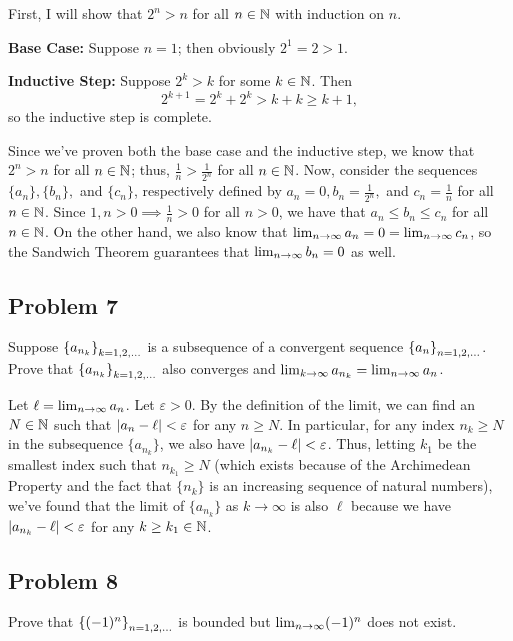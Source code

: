 \documentclass[main.tex]{subfiles}
\begin{document}
\begin{soln}
    First, I will show that $2^n > n$ for all $n\in \mathbb N$ with induction on $n$.

    \textbf{Base Case:} Suppose $n = 1$; then obviously $2^1 = 2 > 1$.

    \textbf{Inductive Step:} Suppose $2^k > k$ for some $k\in \mathbb N$. Then
    \[2^{k + 1} = 2^k + 2^k > k + k \ge k + 1,\]
    so the inductive step is complete.

    Since we've proven both the base case and the inductive step, we know that $2^n > n$ for all $n\in \mathbb N$; thus, $\frac{1}{n} > \frac{1}{2^n}$ for all $n\in \mathbb N$. Now, consider the sequences $\{a_n\}, \{b_n\}, $ and $\{c_n\}$, respectively defined by $a_n = 0, b_n = \frac{1}{2^n},$ and $c_n = \frac{1}{n}$ for all $n\in \mathbb N$. Since $1, n > 0\implies \frac{1}{n} > 0$ for all $n > 0$, we have that $a_n\le b_n\le c_n$ for all $n\in \mathbb N$. On the other hand, we also know that $\lim_{n\to \infty} a_n = 0 = \lim_{n\to \infty} c_n$, so the Sandwich Theorem guarantees that $\lim_{n\to \infty} b_n = 0$ as well.
\end{soln}
\eject

\subsection{Problem 7}
\begin{claim}
    Suppose $\left\{ a_{n_k} \right\}_{k = 1, 2, \ldots}$ is a subsequence of a convergent sequence $\left\{ a_n \right\}_{n = 1, 2, \ldots}$. Prove that $\left\{ a_{n_k} \right\}_{k = 1, 2, \ldots}$ also converges and $\lim_{k\to \infty} a_{n_k} = \lim_{n\to \infty} a_n$.
\end{claim}

\begin{soln}
    Let $\ell = \lim_{n\to \infty} a_n$. Let $\varepsilon > 0$. By the definition of the limit, we can find an $N\in \mathbb N$ such that $\left\lvert a_n - \ell \right\rvert < \varepsilon$ for any $n\ge N$. In particular, for any index $n_k\ge N$ in the subsequence $\{a_{n_k}\}$, we also have $\left\lvert a_{n_k} - \ell \right\rvert < \varepsilon$. Thus, letting $k_1$ be the smallest index such that $n_{k_1}\ge N$ (which exists because of the Archimedean Property and the fact that $\{n_k\}$ is an increasing sequence of natural numbers), we've found that the limit of $\{a_{n_k}\}$ as $k\to\infty$ is also $\ell$ because we have $\left\lvert a_{n_k} - \ell \right\rvert < \varepsilon$ for any $k\ge k_1\in \mathbb N$.
\end{soln}
\eject

\subsection{Problem 8}
\begin{claim}
    Prove that $\left\{ (-1)^n \right\}_{n = 1, 2, \ldots}$ is bounded but $\lim_{n\to \infty} (-1)^n$ does not exist.
\end{claim}
\end{document}
